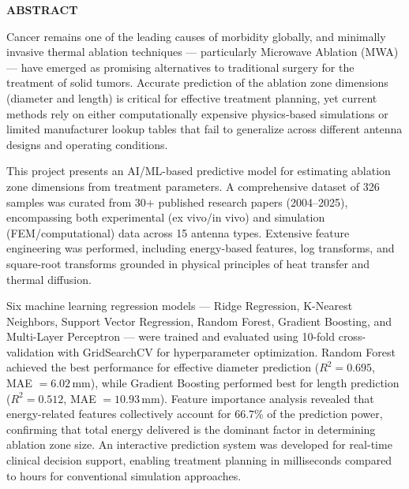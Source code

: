 \documentclass[12pt,a4wide]{report}
\theoremstyle{plain}
\theoremstyle{definition}
\theoremstyle{remark}
\begin{document}
\clearpage




\begin{center}
{\Large{\bf{ABSTRACT}}}
\end{center}


Cancer remains one of the leading causes of morbidity globally, and minimally invasive thermal ablation techniques --- particularly Microwave Ablation (MWA) --- have emerged as promising alternatives to traditional surgery for the treatment of solid tumors. Accurate prediction of the ablation zone dimensions (diameter and length) is critical for effective treatment planning, yet current methods rely on either computationally expensive physics-based simulations or limited manufacturer lookup tables that fail to generalize across different antenna designs and operating conditions.

This project presents an AI/ML-based predictive model for estimating ablation zone dimensions from treatment parameters. A comprehensive dataset of 326 samples was curated from 30+ published research papers (2004--2025), encompassing both experimental (ex vivo/in vivo) and simulation (FEM/computational) data across 15 antenna types. Extensive feature engineering was performed, including energy-based features, log transforms, and square-root transforms grounded in physical principles of heat transfer and thermal diffusion.

Six machine learning regression models --- Ridge Regression, K-Nearest Neighbors, Support Vector Regression, Random Forest, Gradient Boosting, and Multi-Layer Perceptron --- were trained and evaluated using 10-fold cross-validation with GridSearchCV for hyperparameter optimization. Random Forest achieved the best performance for effective diameter prediction ($R^2 = 0.695$, MAE $= 6.02$\,mm), while Gradient Boosting performed best for length prediction ($R^2 = 0.512$, MAE $= 10.93$\,mm). Feature importance analysis revealed that energy-related features collectively account for 66.7\% of the prediction power, confirming that total energy delivered is the dominant factor in determining ablation zone size. An interactive prediction system was developed for real-time clinical decision support, enabling treatment planning in milliseconds compared to hours for conventional simulation approaches.

\clearpage



\tableofcontents
\clearpage
\listoffigures
\listoftables
\end{document}

